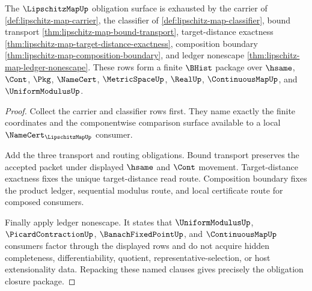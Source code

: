 \begin{theorem}
\label{thm:lipschitz-map-obligation-closure-package}
The $\LipschitzMapUp$ obligation surface is exhausted by the carrier of
\autoref{def:lipschitz-map-carrier}, the classifier of
\autoref{def:lipschitz-map-classifier}, bound transport
\autoref{thm:lipschitz-map-bound-transport}, target-distance exactness
\autoref{thm:lipschitz-map-target-distance-exactness}, composition boundary
\autoref{thm:lipschitz-map-composition-boundary}, and ledger nonescape
\autoref{thm:lipschitz-map-ledger-nonescape}. These rows form a finite
$\BHist$ package over $\hsame$, $\Cont$, $\Pkg$, $\NameCert$,
$\MetricSpaceUp$, $\RealUp$, $\ContinuousMapUp$, and $\UniformModulusUp$.
\end{theorem}
\begin{proof}
Collect the carrier and classifier rows first. They name exactly the finite
coordinates and the componentwise comparison surface available to a local
$\NameCert_{\LipschitzMapUp}$ consumer.

Add the three transport and routing obligations. Bound transport preserves the
accepted packet under displayed $\hsame$ and $\Cont$ movement. Target-distance
exactness fixes the unique target-distance read route. Composition boundary
fixes the product ledger, sequential modulus route, and local certificate route
for composed consumers.

Finally apply ledger nonescape. It states that $\UniformModulusUp$,
$\PicardContractionUp$, $\BanachFixedPointUp$, and $\ContinuousMapUp$
consumers factor through the displayed rows and do not acquire hidden
completeness, differentiability, quotient, representative-selection, or host
extensionality data. Repacking these named clauses gives precisely the
obligation closure package.
\end{proof}

